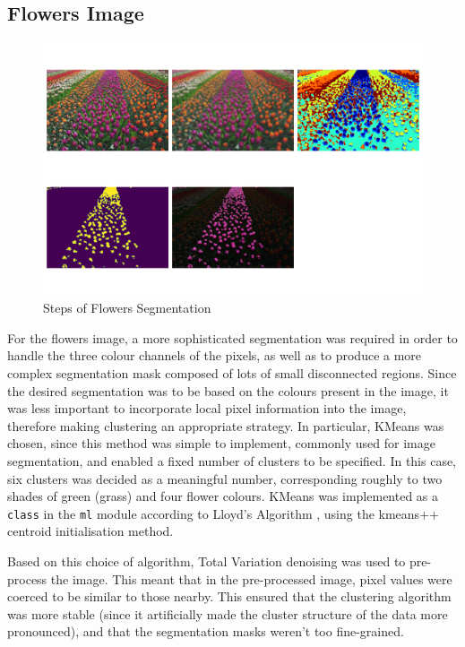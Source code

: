 \documentclass[12pt]{article}
\begin{document}
\subsection{Flowers Image}

\begin{figure}[htp]
    \includegraphics[scale=0.35]{figures/flowers_segmentation.png}
    \caption{Steps of Flowers Segmentation}
    \label{fig:flowers}
\end{figure}

For the flowers image, a more sophisticated segmentation was required in order to handle the three colour channels of the pixels,
as well as to produce a more complex segmentation mask composed of lots of small disconnected regions.
Since the desired segmentation was to be based on the colours present in the image,
it was less important to incorporate local pixel information into the image,
therefore making clustering an appropriate strategy.
In particular, KMeans was chosen, since this method was simple to implement,
commonly used for image segmentation,
and enabled a fixed number of clusters to be specified.
In this case, six clusters was decided as a meaningful number,
corresponding roughly to two shades of green (grass) and four flower colours.
KMeans was implemented as a \texttt{class} in the \texttt{ml} module according to Lloyd's Algorithm \cite{lloyd},
using the kmeans++ \cite{kmeanspp} centroid initialisation method.

Based on this choice of algorithm, Total Variation denoising was used to pre-process the image.
This meant that in the pre-processed image, pixel values were coerced to be similar to those nearby.
This ensured that the clustering algorithm was more stable (since it artificially made the cluster structure of the data more pronounced),
and that the segmentation masks weren't too fine-grained.
\end{document}

